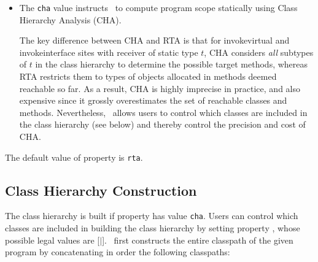 \begin{itemize}
%
%
%
%
\item
The {\tt cha} value instructs \Chord\ to compute program scope
statically using Class Hierarchy Analysis (CHA).

The key difference between CHA and RTA is that for invokevirtual and
invokeinterface sites with receiver of static type $t$, CHA considers
{\it all} subtypes of $t$ in the class hierarchy to determine the
possible target methods, whereas RTA restricts them to types of
objects allocated in methods deemed reachable so far.  As a result,
CHA is highly imprecise in practice, and also expensive since it
grossly overestimates the set of reachable classes and methods.
Nevertheless, \Chord\ allows users to control which classes are
included in the class hierarchy (see below) and thereby control the
precision and cost of CHA.

\end{itemize}
The default value of property  is {\tt rta}.

\subsection{Class Hierarchy Construction}

The class hierarchy is built if property  has
value {\tt cha}.  Users can control which classes are included in
building the class hierarchy by setting property ,
whose possible legal values are [$|$].
\Chord\ first constructs the entire classpath of the given program by
concatenating in order the following classpaths:

